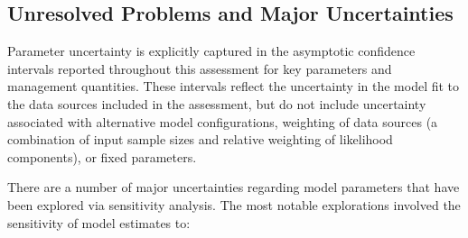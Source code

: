 \documentclass[12pt,]{article}
\begin{document}
\subsection{Unresolved Problems and Major
Uncertainties}\label{unresolved-problems-and-major-uncertainties-1}

Parameter uncertainty is explicitly captured in the asymptotic
confidence intervals reported throughout this assessment for key
parameters and management quantities. These intervals reflect the
uncertainty in the model fit to the data sources included in the
assessment, but do not include uncertainty associated with alternative
model configurations, weighting of data sources (a combination of input
sample sizes and relative weighting of likelihood components), or fixed
parameters.

There are a number of major uncertainties regarding model parameters
that have been explored via sensitivity analysis. The most notable
explorations involved the sensitivity of model estimates to:
\end{document}
